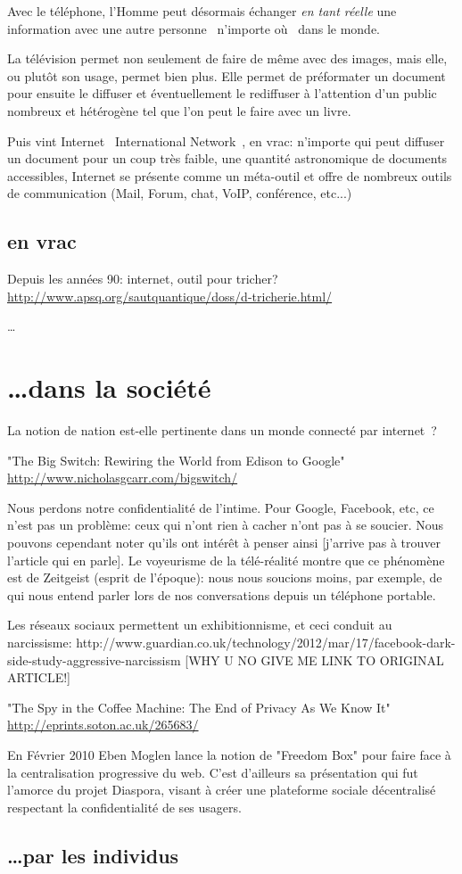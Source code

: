 Avec le téléphone, l'Homme peut désormais échanger \emph{en tant réelle} une 
information avec une autre personne \og{}~n'importe où~\fg{} dans le monde.

La télévision permet non seulement de faire de même avec des images, mais elle,
ou plutôt son usage, permet bien plus. Elle permet de préformater un document pour ensuite le
diffuser et éventuellement le rediffuser à l'attention d'un public nombreux et
hétérogène tel que l'on peut le faire avec un livre.

Puis vint Internet \og{}~International Network~\fg{}, en vrac: n'importe qui
peut diffuser un document pour un coup très faible, une quantité astronomique
de documents accessibles, Internet se présente comme un méta-outil et offre de
nombreux outils de communication (Mail, Forum, chat, VoIP, conférence, etc...)

\subsection{en vrac}



Depuis les années 90: internet, outil pour tricher?
\url{http://www.apsq.org/sautquantique/doss/d-tricherie.html/}

\ldots

\section{\ldots dans la société}

La notion de nation est-elle pertinente dans un monde connecté par
internet~?

"The Big Switch: Rewiring the World from Edison to Google" 
 \url{http://www.nicholasgcarr.com/bigswitch/}

Nous perdons notre confidentialité de l'intime. Pour Google, Facebook, etc, 
ce n'est pas un problème: ceux qui n'ont rien à cacher n'ont pas à se soucier. Nous
pouvons cependant noter qu'ils ont intérêt à penser ainsi [j'arrive pas à 
trouver l'article qui en parle]. Le voyeurisme de la télé-réalité montre 
que ce phénomène est de Zeitgeist (esprit de l'époque): nous nous soucions 
moins, par exemple, de qui nous entend parler lors de nos
conversations depuis un téléphone portable.

Les réseaux sociaux permettent un exhibitionnisme, et ceci conduit au 
narcissisme:
http://www.guardian.co.uk/technology/2012/mar/17/facebook-dark-side-study-aggressive-narcissism 
[WHY U NO GIVE ME LINK TO ORIGINAL ARTICLE!]

"The Spy in the Coffee Machine: The End of Privacy As We Know It"
 \url{http://eprints.soton.ac.uk/265683/}

En Février 2010 Eben Moglen lance la notion de "Freedom Box" pour faire face à
la centralisation progressive du web. C'est d'ailleurs sa présentation qui fut
l'amorce du projet Diaspora, visant à créer une plateforme sociale décentralisé 
respectant la confidentialité de ses usagers. 

\subsection{\ldots par les individus}


